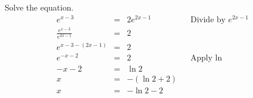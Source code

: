 \begin{frame}
\begin{example}
Solve the equation.
\[\renewcommand{\arraystretch}{1.7}
\begin{array}{rcll|l}
\displaystyle e^{x-3}&=&\displaystyle 2 e^{2x-1}&&\text{Divide by } e^{2x-1}\\
\displaystyle \frac{e^{x-3}}{e^{2x-1}}&=&2\\
\displaystyle e^{x-3-(2x-1)} &=& 2\\
\displaystyle e^{-x-2} &=& 2&&\text{Apply }\ln\\
-x-2&=&\ln 2\\
x&=&-(\ln 2+2)\\
x&=&-\ln 2-2
\end{array}
\]
\end{example}
\end{frame}

